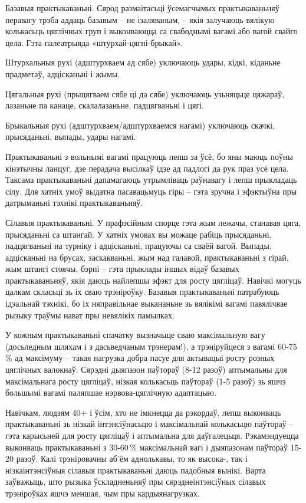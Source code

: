 Базавыя практыкаваньні. Сярод размаітасьці ўсемагчымых практыкаваньняў перавагу трэба аддаць базавым – не ізаляваным, – якія залучаюць вялікую колькасьць цяглічных груп і выконваюцца са свабоднымі вагамі або вагой свайго цела. Гэта палеатрыяда «штурхай-цягні-брыкай». 

Штурхальныя рухі (адштурхваем ад сябе) уключаюць удары, кідкі, кіданьне прадметаў, адцісканьні і жымы. 

Цягальныя рухі (прыцягваем сябе ці да сябе) уключаюць узьняцьце цяжараў, лазаньне па канаце, скалалазаньне, падцягваньні і цягі. 

Брыкальныя рухі (адштурхваем/адштурхваемся нагамі) уключаюць скачкі, прысяданьні, выпады, удары нагамі. 

Практыкаваньні з вольнымі вагамі працуюць лепш за ўсё, бо яны маюць поўны кінэтычны ланцуг, дзе перадача высілкаў ідзе ад падлогі да рук праз усё цела. Таксама практыкаваньні дапамагаюць утрымліваць раўнавагу і лепш прыкладаць сілу. Для хатніх умоў выдатна пасавацьмуць гіры – гэта зручна і эфэктыўна пры датрыманьні тэхнікі практыкаваньняў.

Сілавыя практыкаваньні. У прафэсійным спорце гэта жым лежачы, станавая цяга, прысяданьні са штангай. У хатніх умовах вы можаце рабіць прысяданьні, падцягваньні на турніку і адцісканьні, працуючы са сваёй вагой. Выпады, адцісканьні на брусах, заскакваньні, жым над галавой, практыкаваньні з гірай, жым штангі стоячы, бэрпі – гэта прыклады іншых відаў базавых практыкаваньняў, якія даюць найлепшы эфэкт для росту цягліцаў. Навічкі могуць цалкам скласьці зь іх сваю трэніроўку. Базавыя практыкаваньні патрабуюць ідэальнай тэхнікі, бо іх няправільнае выкананьне зь вялікімі вагамі павялічвае рызыку траўмы нават пры невялікіх памылках.

У кожным практыкаваньні спачатку вызначыце сваю максімальную вагу (досьледным шляхам і з дасьведчаным трэнерам!), а трэніруйцеся з вагамі 60-75\,\% ад максімуму – такая нагрузка добра пасуе для актывацыі росту розных цяглічных валокнаў. Сярэдні дыяпазон паўтораў (8-12 разоў) аптымальны для максімальнага росту цягліцаў, нізкая колькасьць паўтораў (1-5 разоў) зь яшчэ большымі вагамі паляпшае нэрвова-цяглічную адаптацыю.

Навічкам, людзям 40+ і ўсім, хто не імкнецца да рэкордаў, лепш выконваць практыкаваньні зь нізкай інтэнсіўнасьцю і максімальнай колькасьцю паўтораў – гэта карысьней для росту цягліцаў і аптымальна для даўгалецьця. Рэкамэндуецца выконваць практыкаваньні з 30-60\,\% максімальнай вагі і дыяпазонам паўтораў 15-20 разоў. Калі трэніровачны аб'ём аднолькавы, то як высока-, так і нізкаінтэнсіўныя сілавыя практыкаваньні даюць падобныя вынікі. Варта заўважыць, што рызыка ўскладненьняў пры сярэднеінтэнсіўных сілавых трэніроўках яшчэ меншая, чым пры кардыянагрузках.

